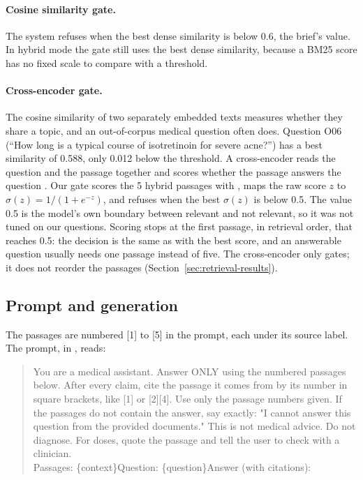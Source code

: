 \paragraph{Cosine similarity gate.} The system refuses when the best dense similarity is below 0.6, the brief's value. In hybrid mode the gate still uses the best dense similarity, because a BM25 score has no fixed scale to compare with a threshold.

\paragraph{Cross-encoder gate.} The cosine similarity of two separately embedded texts measures whether they share a topic, and an out-of-corpus medical question often does. Question O06 (``How long is a typical course of isotretinoin for severe acne?'') has a best similarity of 0.588, only 0.012 below the threshold. A cross-encoder reads the question and the passage together and scores whether the passage answers the question \citep{nogueira2019passage}. Our gate scores the 5 hybrid passages with , maps the raw score $z$ to $\sigma(z) = 1/(1+e^{-z})$, and refuses when the best $\sigma(z)$ is below 0.5. The value 0.5 is the model's own boundary between relevant and not relevant, so it was not tuned on our questions. Scoring stops at the first passage, in retrieval order, that reaches 0.5: the decision is the same as with the best score, and an answerable question usually needs one passage instead of five. The cross-encoder only gates; it does not reorder the passages (Section~\ref{sec:retrieval-results}).

\subsection{Prompt and generation}

The passages are numbered [1] to [5] in the prompt, each under its source label. The prompt,  in , reads:

\begin{quote}\small\ttfamily\raggedright
You are a medical assistant. Answer ONLY using the numbered passages below. After every claim, cite the passage it comes from by its number in square brackets, like [1] or [2][4]. Use only the passage numbers given. If the passages do not contain the answer, say exactly: "I cannot answer this question from the provided documents." This is not medical advice. Do not diagnose. For doses, quote the passage and tell the user to check with a clinician.\\
Passages: \{context\}\quad Question: \{question\}\quad Answer (with citations):
\end{quote}

